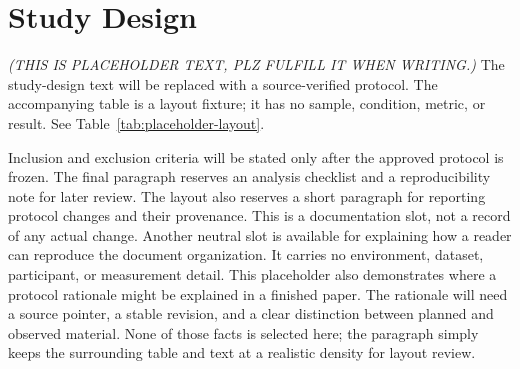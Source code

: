 \section{Study Design}\label{sec:study-design}
\textit{(THIS IS PLACEHOLDER TEXT, PLZ FULFILL IT WHEN WRITING.)}
The study-design text will be replaced with a source-verified protocol. The accompanying table is a layout fixture; it has no sample, condition, metric, or result. See Table~\ref{tab:placeholder-layout}.

Inclusion and exclusion criteria will be stated only after the approved protocol is frozen.
The final paragraph reserves an analysis checklist and a reproducibility note for later review.
The layout also reserves a short paragraph for reporting protocol changes and their provenance. This is a documentation slot, not a record of any actual change.
Another neutral slot is available for explaining how a reader can reproduce the document organization. It carries no environment, dataset, participant, or measurement detail.
This placeholder also demonstrates where a protocol rationale might be explained in a finished paper. The rationale will need a source pointer, a stable revision, and a clear distinction between planned and observed material. None of those facts is selected here; the paragraph simply keeps the surrounding table and text at a realistic density for layout review.
